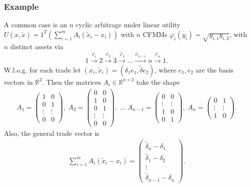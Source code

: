 \subsubsection{Example}
A common case is an $n$ cyclic arbitrage under linear utility $U(x, \tilde{x})
=1^{T}\left(\sum_{i=1}^{m} A_i(\tilde{x}_i-x_i)\right)$  with $n$ CFMMs $\varphi_i(y_i) =
\sqrt{y_{i,1}y_{i,2}}$, with $n$ distinct assets via
\begin{align}
    1 \xrightarrow{\varphi_1} 2 \xrightarrow{\varphi_2} 3
    \xrightarrow{\varphi_3} \hdots \xrightarrow{\varphi_{n-1}} n
    \xrightarrow{\varphi_n} 1.
\end{align}
W.l.o.g. for each trade let $(x_i, \tilde{x}_i) = (\delta_1e_1,
\tilde{\delta}e_2)$, where $e_1, e_2$ are the basis vectors in
$\mathbb{R}^{2}$. Then the matrices $A_i \in \mathbb{R}^{n\times2}  $ take the shape
\begin{align}
   A_1 =
   \begin{pmatrix}
   1 & 0 \\
   0 & 1 \\
   \vdots & \vdots \\
   0 & 0
    \end{pmatrix},\;
   A_2 =
   \begin{pmatrix}
   0 & 0 \\
   1 & 0 \\
   0 & 1 \\
   \vdots & \vdots \\
   0 & 0
    \end{pmatrix},\; \ldots  \;
   A_{n-1} =
   \begin{pmatrix}
   0 & 0 \\
   \vdots & \vdots \\
   1 & 0\\
   0 & 1
    \end{pmatrix},\;
   A_n =
   \begin{pmatrix}
   0 & 1 \\
   \vdots & \vdots \\
   1 & 0
    \end{pmatrix}.
\end{align}
Also, the general trade vector is
\begin{align}
    \sum_{i=1}^{m} A_i(\tilde{x}_i-x_i) =
    \begin{pmatrix}
        \tilde{\delta}_n - \delta_1\\
        \tilde{\delta}_1 -\delta_2\\
        \vdots\\
        \tilde{\delta}_{n-1} - \delta_n
    \end{pmatrix}.
\end{align}
